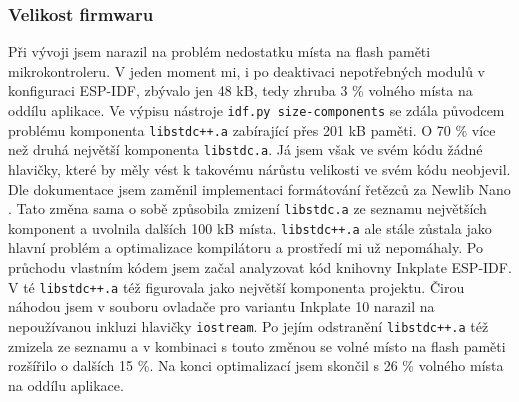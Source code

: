 \subsubsection{Velikost firmwaru} Při vývoji jsem narazil na problém nedostatku místa na flash paměti mikrokontroleru. V jeden moment mi, i po deaktivaci nepotřebných modulů v konfiguraci ESP-IDF, zbývalo jen 48 kB, tedy zhruba 3 \% volného místa na oddílu aplikace. Ve výpisu nástroje \lstinline|idf.py size-components| se zdála původcem problému komponenta \lstinline|libstdc++.a| zabírající přes 201 kB paměti. O 70 \% více než druhá největší komponenta \lstinline|libstdc.a|. Já jsem však ve svém kódu žádné hlavičky, které by měly vést k takovému nárůstu velikosti ve svém kódu neobjevil. Dle dokumentace jsem zaměnil implementaci formátování řetězců za Newlib Nano \cite{MinimizingBinarySize}. Tato změna sama o sobě způsobila zmizení \lstinline|libstdc.a| ze seznamu největších komponent a uvolnila dalších 100 kB místa. \lstinline|libstdc++.a| ale stále zůstala jako hlavní problém a optimalizace kompilátoru a prostředí mi už nepomáhaly. Po průchodu vlastním kódem jsem začal analyzovat kód knihovny Inkplate ESP-IDF. V té \lstinline|libstdc++.a| též figurovala jako největší komponenta projektu. Čirou náhodou jsem v souboru ovladače pro variantu Inkplate 10 narazil na nepoužívanou inkluzi hlavičky \lstinline|iostream|. Po jejím odstranění \lstinline|libstdc++.a| též zmizela ze seznamu a v kombinaci s touto změnou se volné místo na flash paměti rozšířilo o dalších 15 \%. Na konci optimalizací jsem skončil s 26 \% volného místa na oddílu aplikace.
